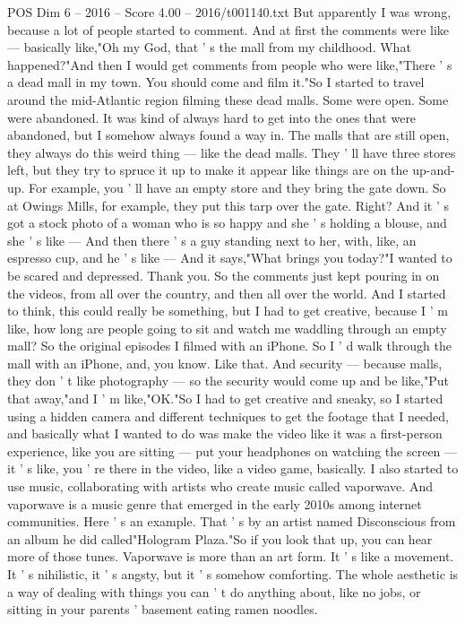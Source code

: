\begin{textsample}{POS Dim 6 – 2016 – Score 4.00 – 2016/t001140.txt}
But apparently I was wrong, because a lot of people started to comment.
And at first the comments were like — basically like,"Oh my God, that ' s the mall from my childhood.
What happened?"And then I would get comments from people who were like,"There ' s a dead mall in my town.
You should come and film it."So I started to travel around the mid-Atlantic region filming these dead malls.
Some were open.
Some were abandoned.
It was kind of always hard to get into the ones that were abandoned, but I somehow always found a way in.
The malls that are still open, they always do this weird thing — like the dead malls.
They ' ll have three stores left, but they try to spruce it up to make it appear like things are on the up-and-up.
For example, you ' ll have an empty store and they bring the gate down.
So at Owings Mills, for example, they put this tarp over the gate.
Right?
And it ' s got a stock photo of a woman who is so happy and she ' s holding a blouse, and she ' s like — And then there ' s a guy standing next to her, with, like, an espresso cup, and he ' s like — And it says,"What brings you today?"I wanted to be scared and depressed.
Thank you.
So the comments just kept pouring in on the videos, from all over the country, and then all over the world.
And I started to think, this could really be something, but I had to get creative, because I ' m like, how long are people going to sit and watch me waddling through an empty mall?
So the original episodes I filmed with an iPhone.
So I ' d walk through the mall with an iPhone, and, you know.
Like that.
And security — because malls, they don ' t like photography — so the security would come up and be like,"Put that away,"and I ' m like,"OK."So I had to get creative and sneaky, so I started using a hidden camera and different techniques to get the footage that I needed, and basically what I wanted to do was make the video like it was a first-person experience, like you are sitting — put your headphones on watching the screen — it ' s like, you ' re there in the video, like a video game, basically.
I also started to use music, collaborating with artists who create music called vaporwave.
And vaporwave is a music genre that emerged in the early 2010s among internet communities.
Here ' s an example.
That ' s by an artist named Disconscious from an album he did called"Hologram Plaza."So if you look that up, you can hear more of those tunes.
Vaporwave is more than an art form.
It ' s like a movement.
It ' s nihilistic, it ' s angsty, but it ' s somehow comforting.
The whole aesthetic is a way of dealing with things you can ' t do anything about, like no jobs, or sitting in your parents ' basement eating ramen noodles.

\end{textsample}
